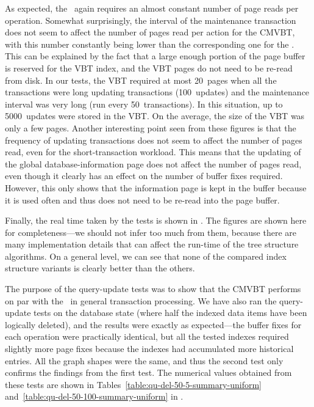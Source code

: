 As expected, the \TSBtree\ again requires an almost constant number of page
reads per operation.
Somewhat surprisingly, the interval of the maintenance transaction
does not seem to affect the number of pages read per action for the
CMVBT, with this number constantly being lower than the corresponding
one for the \TSBtree.
This can be explained by the fact that a large enough portion of the
page buffer is reserved for the VBT index, and the VBT pages do not
need to be re-read from disk.
In our tests, the VBT required\label{test:vbt-size} at most
\num{20}~pages when all the transactions were long updating transactions
(\num{100}~updates) and the maintenance interval was very long (run every
\num{50}~transactions). 
In this situation, up to \num{5000}~updates were stored in the VBT\@. 
On the average, the size of the VBT was only a few pages.
Another interesting point seen from these figures is that the frequency
of updating transactions does not seem to affect the number of pages
read, even for the short-transaction workload. 
This means that the updating of the global database-information page
does not affect the number of pages read, even though it clearly has
an effect on the number of buffer fixes required.
However, this only shows that the information page is kept in the
buffer because it is used often and thus does not need to be re-read into
the page buffer.

Finally, the real time taken by the tests is shown in
.
The figures are shown here for completeness---we should not infer too much
from them, because there are many implementation details that can affect the
run-time of the tree structure algorithms.
On a general level, we can see that none of the compared index structure
variants is clearly better than the others. 

The purpose of the query-update tests was to show that the CMVBT 
performs on par with the \TSBtree\ in general transaction processing.
We have also ran the query-update tests on the  database
state (where half the indexed data items have been logically deleted),
and the results were exactly as expected---the buffer fixes for each
operation were practically identical, but all the tested indexes required
slightly more page fixes because the indexes had accumulated more
historical entries. 
All the graph shapes were the same, and thus the second test only
confirms the findings from the first test. 
The numerical values obtained from these tests are shown in
Tables~\ref{table:qu-del-50-5-summary-uniform}
and~\ref{table:qu-del-50-100-summary-uniform} in
.



